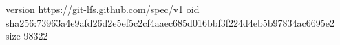 version https://git-lfs.github.com/spec/v1
oid sha256:73963a4e9afd26d2e5ef5c2cf4aaec685d016bbf3f224d4eb5b97834ac6695e2
size 98322

